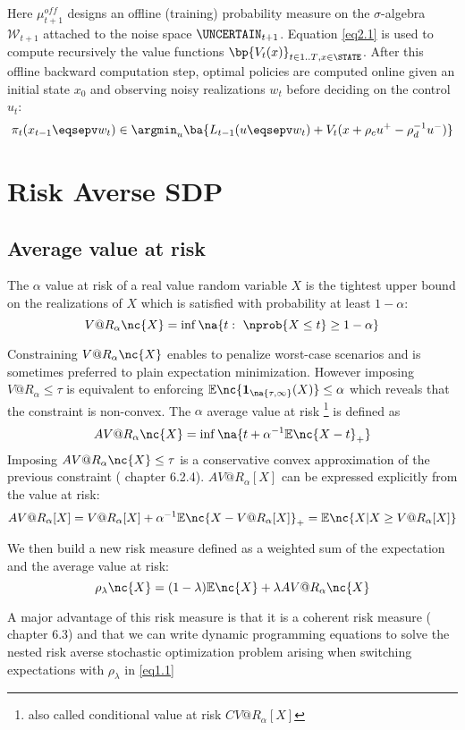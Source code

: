 \documentclass[10pt,a4paper]{article}
\begin{document}
\noindent Here $\mu_{t+1}^{off}$ designs an offline (training) probability measure on the $\sigma$-algebra $\mathcal{W}_{t+1}$ attached to the noise space $\UNCERTAIN_{t+1}$. Equation \eqref{eq2.1} is used to compute recursively the value functions $\bp{V_t(x)}_{t \in {1..T}, x \in \STATE}$. After this offline backward computation step, optimal policies are computed online given an initial state $x_0$ and observing noisy realizations $w_t$ before deciding on the control $u_t$:
\[ \pi_t(x_{t-1} \eqsepv w_t) \in \argmin_u{\ba{L_{t-1}(u \eqsepv w_t) + V_t(x + \rho_c u^+ - \rho^{-1}_d u^-)}} \]

\section{Risk Averse SDP}

\subsection{Average value at risk}

\noindent The $\alpha$ value at risk of a real value random variable $X$ is the tightest upper bound on the realizations of $X$ which is satisfied with probability at least $1-\alpha$:
\[ V@R_{\alpha}\nc{X} = \inf \na{t: \ \nprob{X \leq t} \geq 1-\alpha } \] 

\noindent Constraining $V@R_\alpha\nc{X}$ enables to penalize worst-case scenarios and is sometimes preferred to plain expectation minimization. However imposing $V@R_\alpha \leq \tau$ is equivalent to enforcing $\mathbb{E}\nc{\boldsymbol{1}_{\na{\tau, \infty}}(X)} \leq \alpha$ which reveals that the constraint is non-convex. The $\alpha$ average value at risk \footnote{also called conditional value at risk $CV@R_\alpha[X]$} is defined as 
\[ AV@R_\alpha\nc{X} = \inf \na{t + \alpha^{-1} \mathbb{E}\nc{X-t}_+ } \]
\noindent Imposing $AV@R_\alpha\nc{X} \leq \tau$ is a conservative convex approximation of the previous constraint (\cite{shapiro2009lectures} chapter 6.2.4). $AV@R_\alpha[X]$ can be expressed explicitly from the value at risk:
\[ AV@R_{\alpha}[X] = V@R_\alpha[X] + \alpha^{-1}\mathbb{E}\nc{X-V@R_\alpha[X]}_+ = \mathbb{E}\nc{X|X \geq V@R_\alpha[X]} \]

\noindent We then build a new risk measure defined as a weighted sum of the expectation and the average value at risk:
\[ \rho_\lambda\nc{X} = (1-\lambda) \mathbb{E}\nc{X} + \lambda AV@R_\alpha\nc{X} \]

\noindent A major advantage of this risk measure is that it is a coherent risk measure (\cite{shapiro2009lectures} chapter 6.3) and that we can write dynamic programming equations to solve the nested risk averse stochastic optimization problem arising when switching expectations with $\rho_\lambda$ in \eqref{eq1.1}
\end{document}
